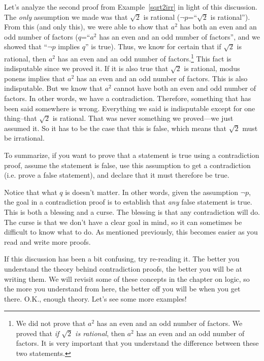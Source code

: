 Let's analyze the second proof from Example~\ref{sqrt2irr} in light of this discussion.
The {\em only} assumption we made was that $\sqrt{2}$ is rational ($\neg p$=``$\sqrt{2}$ is rational'').
From this (and only this), we were able to show that $a^2$ has both an even and an odd number
of factors ($q$=``$a^2$ has an even and an odd number of factors'', and we showed that ``$\neg p$ implies $q$''
is true).
Thus, we know for certain that if $\sqrt{2}$ is rational, 
then $a^2$ has an even and an odd number of factors.\footnote{We did not prove
that $a^2$ has an even and an odd number of factors.  We proved that {\em if $\sqrt{2}$ is rational}, 
then $a^2$ has an even and an odd number of factors.  It is very important that you understand the
difference between these two statements.}
This fact is indisputable since we proved it.  
If it is also true that $\sqrt{2}$ is rational, modus ponens implies that 
$a^2$ has an even and an odd number of factors.  This is also indisputable.  
But we know that $a^2$ cannot have both an even and odd number of factors.  
In other words, we have a contradiction.  Therefore, something that has been said somewhere is wrong.
Everything we said is indisputable except for one thing--that $\sqrt{2}$ is rational. 
That was never something we proved---we just assumed it. 
So it has to be the case that this is false, which means that $\sqrt{2}$ must be irrational.

To summarize, if you want to prove that a statement is true using a contradiction proof, 
assume the statement is false, use this assumption to get a contradiction (i.e. prove a false statement),
and declare that it must therefore be true.

Notice that what $q$ is doesn't matter.  In other words, given the assumption 
$\neg p$, the goal in a contradiction proof is to establish that {\em any} false statement is true.
This is both a blessing and a curse.  The blessing is that any contradiction will do.  
The curse is that we don't have a clear goal in mind, so it can sometimes be difficult to know what to do.
As mentioned previously, this becomes easier as you read and write more proofs.

If this discussion has been a bit confusing, try re-reading it.  The better you understand the theory
behind contradiction proofs, the better you will be at writing them.  
We will revisit some of these concepts in the chapter on logic, so the more you understand from here, the
better off you will be when you get there.
O.K., enough theory.  Let's see some more examples!

